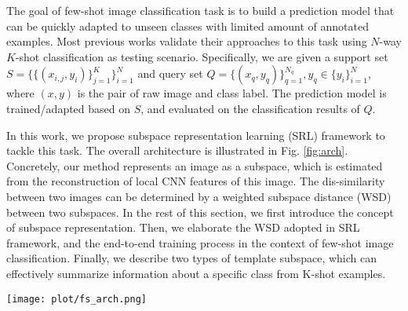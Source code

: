 
The goal of few-shot image classification task is to build a prediction model that can be quickly adapted to unseen classes with limited amount of annotated examples.
Most previous works validate their approaches to this task using $N$-way $K$-shot classification as testing scenario.
Specifically, we are given a support set $S= \{\{(x_{i, j}, y_i) \}_{j=1}^{K} \}_{i=1}^N$ and query set $Q = \{(x_q, y_q)\}_{q=1}^{N_q}, y_q \in \{y_i\}_{i=1}^N$, where $(x,y)$ is the pair of raw image and class label.
The prediction model is trained/adapted based on $S$, and evaluated on the classification results of $Q$.

In this work, we propose subspace representation learning (SRL) framework to tackle this task.
The overall architecture is illustrated in Fig. \ref{fig:arch}.
Concretely, our method represents an image as a subspace, which is estimated from the reconstruction of local CNN features of this image.
The dis-similarity between two images can be determined by a weighted subspace distance (WSD) between two subspaces.
In the rest of this section, we first introduce the concept of subspace representation.
Then, we elaborate the WSD adopted in SRL framework, and the end-to-end training process in the context of few-shot image classification.
Finally, we describe two types of template subspace, which can effectively summarize information about a specific class from K-shot examples.


\begin{figure*}
\centering
  \texttt{[image: plot/fs\_arch.png]}
  \caption{The overall architecture of proposed subspace representation learning (SRL) framework. The backbone CNN extracts the local feature map ($h \times w \times d$) from each query and support image. After reshaping the feature map into a matrix $H \in \mathbb{R}^{d \times (h \cdot w)}$, whose columns are the CNN features at every spatial location, we extract the subspace representation by conducting SVD. The similarity between two images is determined by a weighted subspace distance (WSD). The end-to-end training is guided by the loss function of a distance based classifier.}
  \label{fig:arch}
\end{figure*}


